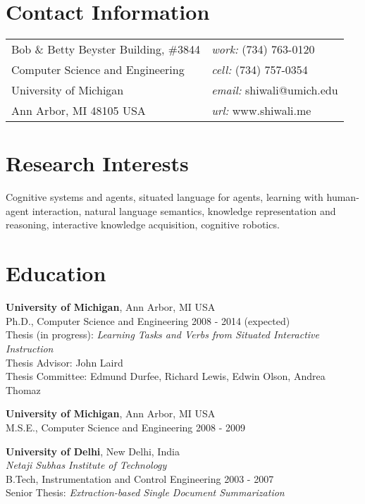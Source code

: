 \documentclass[margin,line,11pt]{res}
\begin{document}

\thispagestyle{empty}
\begin{resume}
\section{\sc Contact Information}
\vspace{.05in}
\begin{tabular}{@{}p{3in}p{4in}}
Bob \& Betty Beyster Building, \#3844             & {\it work:}  (734) 763-0120 \\            
Computer Science and Engineering                  & {\it cell:}    (734) 757-0354 \\         
University of Michigan                            & {\it email:}  shiwali@umich.edu\\       
Ann Arbor, MI  48105 USA                          & {\it url:} www.shiwali.me \\     
\end{tabular}


\section{\sc Research Interests}
Cognitive systems and agents, situated language for agents, learning with human-agent interaction, natural language semantics, knowledge representation and reasoning, interactive knowledge acquisition, cognitive robotics.

\section{\sc Education}
{\bf University of Michigan}, Ann Arbor, MI USA\\
Ph.D., Computer Science and Engineering \hfill 2008 - 2014 (expected)\\
Thesis (in progress):  \emph{Learning Tasks and Verbs from Situated Interactive Instruction} \\
Thesis Advisor:  John Laird \\
Thesis Committee: Edmund Durfee, Richard Lewis, Edwin Olson, Andrea Thomaz

{\bf University of Michigan}, Ann Arbor, MI USA\\
M.S.E., Computer Science and Engineering \hfill 2008 - 2009

{\bf University of Delhi}, New Delhi, India\\
{\em Netaji Subhas Institute of Technology}\\
B.Tech,  Instrumentation and Control Engineering \hfill 2003 - 2007\\ 
Senior Thesis: \emph{Extraction-based Single Document Summarization}




\end{resume}
\end{document}
